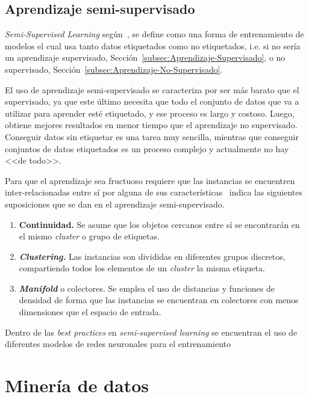 \subsection{Aprendizaje semi-supervisado}\label{subsec:Aprendizaje-Semi-Supervisado}
\textit{Semi-Supervised Learning} según~\cite{zhou2014semi}, se define como una forma de entrenamiento de modelos el cual usa tanto datos etiquetados como no etiquetados, i.e. si no sería un aprendizaje supervisado, Sección~\ref{subsec:Aprendizaje-Supervisado}, o no supervisado, Sección~\ref{subsec:Aprendizaje-No-Supervisado}. 

El uso de aprendizaje semi-supervisado se caracteriza por ser más barato que el supervisado, ya que este último necesita que todo el conjunto de datos que va a utilizar para aprender esté etiquetado, y ese proceso es largo y costoso. Luego, obtiene mejores resultados en menor tiempo que el aprendizaje no supervisado. 
Conseguir datos sin etiquetar es una tarea muy sencilla, mientras que conseguir conjuntos de datos etiquetados es un proceso complejo y actualmente no hay <<de todo>>.

Para que el aprendizaje sea fructuoso requiere que las instancias se encuentren inter-relacionadas entre sí por alguna de sus características~\cite{javatpoint_semisupervised} indica las siguientes suposiciones que se dan en el aprendizaje semi-supervisado.
\begin{enumerate}
	\item \textbf{Continuidad.} Se asume que los objetos cercanos entre sí se encontrarán en el mismo \textit{cluster} o grupo de etiquetas. 
	\item \textbf{\textit{Clustering.}} Las instancias son divididas en diferentes grupos discretos, compartiendo todos los elementos de un \textit{cluster} la misma etiqueta.
	\item \textbf{\textit{Manifold}} o colectores. Se emplea el uso de distancias y funciones de densidad de forma que las instancias se encuentran en colectores con menos dimensiones que el espacio de entrada.
\end{enumerate}

Dentro de las \textit{best practices} en \textit{semi-supervised learning} se encuentran el uso de diferentes modelos de redes neuronales para el entrenamiento~\cite{thekumparampil2018attention}
\vfill

\section{Minería de datos}

